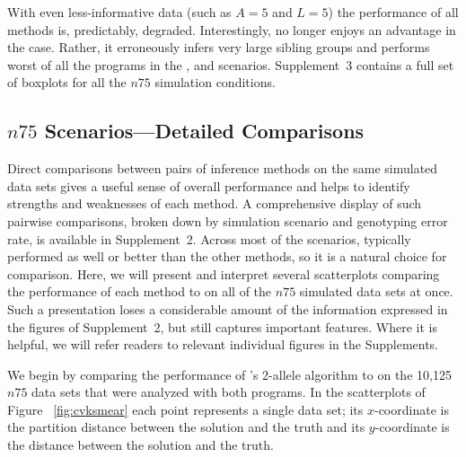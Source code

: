 With even less-informative data (such as $A=5$ and $L=5$) the performance of all methods is, predictably, 
degraded.  Interestingly, \prt{} no longer enjoys an advantage in the \nosibs{} case.  Rather, it erroneously infers very large sibling groups and performs worst of all the programs in the \nosibs{}, \allhalf{} and \allpathalf{} scenarios.  Supplement~3 contains a full set of boxplots for all the $n75$ simulation 
conditions.

\subsection*{$n75$ Scenarios---Detailed Comparisons}
Direct comparisons between pairs of inference methods on the same simulated data sets gives a useful 
sense of overall performance and helps to identify strengths and weaknesses of each method. A 
comprehensive display of such pairwise comparisons, broken down by simulation scenario and genotyping 
error rate, is available in Supplement~2. Across most of the scenarios, \colony{} typically performed 
as well or better than the other methods, so it is a natural choice for comparison.
Here, we will present and interpret several scatterplots comparing the performance of each method to 
\colony{} on all of the $n75$ simulated data sets at once.  Such a presentation loses a considerable 
amount of the information expressed in the figures of Supplement~2, but still captures important 
features.  Where it is helpful, we will refer readers to relevant individual figures in the 
Supplements.

We begin by comparing the performance of  \kinalyzer{}'s 2-allele algorithm to \colony{} on the 10,125 
$n75$ data sets that were analyzed with both programs.  In the scatterplots of Figure~
\ref{fig:cvksmear} each point represents a single data set; its $x$-coordinate is the partition 
distance between the \colony{} solution and the truth and its $y$-coordinate is the distance between 
the \kinalyzer{} solution and the truth.


